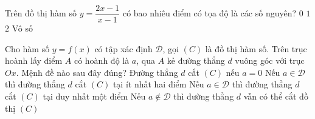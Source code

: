 \begin{ex}%
	Trên đồ thị hàm số $y=\dfrac{2x-1}{x-1}$ có bao nhiêu điểm có tọa độ là các số nguyên?
	\choice
	{$0$}
	{$1$}
	{\True $2$}
	{Vô số}
\end{ex}

\begin{ex}%
	Cho hàm số $y=f(x)$ có tập xác định $\mathscr{D}$, gọi $(C)$ là đồ thị hàm số. Trên trục hoành lấy điểm $A$ có hoành độ là $a$, qua $A$ kẻ đường thẳng $d$ vuông góc với trục $Ox$. Mệnh đề nào sau đây đúng?
	\choice
	{Đường thẳng $d$ cắt $(C)$ nếu $a=0$}
	{Nếu $a\in\mathscr{D}$ thì đường thẳng $d$ cắt $(C)$ tại ít nhất hai điểm}
	{\True Nếu $a\in\mathscr{D}$ thì đường thẳng $d$ cắt $(C)$ tại duy nhất một điểm}
	{Nếu $a\notin\mathscr{D}$ thì đường thẳng $d$ vẫn có thể cắt đồ thị $(C)$}
\end{ex}

